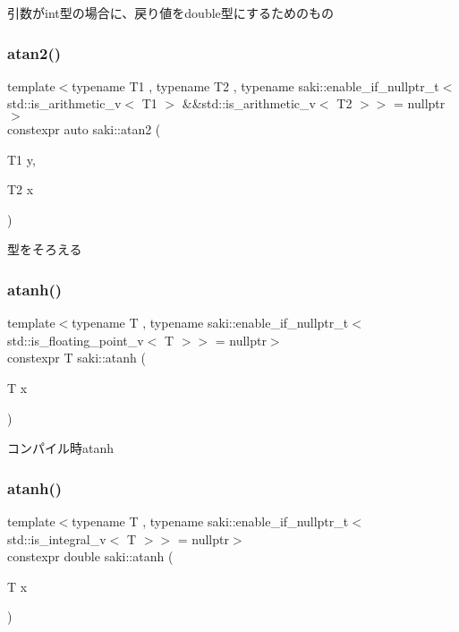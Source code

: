引数がint型の場合に、戻り値をdouble型にするためのもの 

\mbox{\label{namespacesaki_a3f53502e50280167d22bef45227219f0}} 
\subsubsection{\texorpdfstring{atan2()}{atan2()}\hspace{0.1cm}{\footnotesize\ttfamily [3/3]}}
{\footnotesize\ttfamily template$<$typename T1 , typename T2 , typename saki\+::enable\+\_\+if\+\_\+nullptr\+\_\+t$<$ std\+::is\+\_\+arithmetic\+\_\+v$<$ T1 $>$ \&\&std\+::is\+\_\+arithmetic\+\_\+v$<$ T2 $>$$>$  = nullptr$>$ \\
constexpr auto saki\+::atan2 (\begin{DoxyParamCaption}\item[{T1}]{y,  }\item[{T2}]{x }\end{DoxyParamCaption})}



型をそろえる 

\mbox{\label{namespacesaki_adbfceeab527c51676d00fae31e077dcf}} 
\subsubsection{\texorpdfstring{atanh()}{atanh()}\hspace{0.1cm}{\footnotesize\ttfamily [1/2]}}
{\footnotesize\ttfamily template$<$typename T , typename saki\+::enable\+\_\+if\+\_\+nullptr\+\_\+t$<$ std\+::is\+\_\+floating\+\_\+point\+\_\+v$<$ T $>$$>$  = nullptr$>$ \\
constexpr T saki\+::atanh (\begin{DoxyParamCaption}\item[{T}]{x }\end{DoxyParamCaption})}



コンパイル時atanh 

\mbox{\label{namespacesaki_a1b7d87f99b61600e1201b10de467200f}} 
\subsubsection{\texorpdfstring{atanh()}{atanh()}\hspace{0.1cm}{\footnotesize\ttfamily [2/2]}}
{\footnotesize\ttfamily template$<$typename T , typename saki\+::enable\+\_\+if\+\_\+nullptr\+\_\+t$<$ std\+::is\+\_\+integral\+\_\+v$<$ T $>$$>$  = nullptr$>$ \\
constexpr double saki\+::atanh (\begin{DoxyParamCaption}\item[{T}]{x }\end{DoxyParamCaption})}



